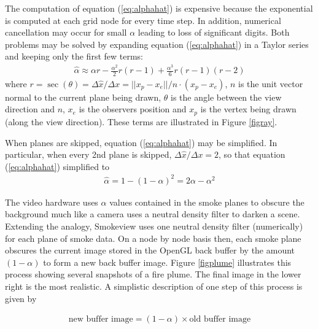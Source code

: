 \documentclass[11pt,twoside]{book}
\begin{document}
The computation of equation (\ref{eq:alphahat}) is expensive
because the exponential is computed at each grid node for every
time step.  In addition, numerical cancellation may occur for
small $\alpha$ leading to loss of significant digits. Both
problems may be solved by expanding equation (\ref{eq:alphahat})
in a Taylor series and keeping only the first few terms:
\begin{eqnarray*}
\hat{\alpha}\approx \alpha r -
\frac{\alpha^2}{2}r(r-1)+\frac{\alpha^3}{6}r(r-1)(r-2)
\end{eqnarray*}
where $r=\sec(\theta)=\Delta \hat{x}/\Delta
x=||x_p-x_e||/n\cdot(x_p-x_e)$, $n$ is the unit vector normal to
the current plane being drawn, $\theta$ is the angle between the
view direction and $n$, $x_e$ is the observers position and $x_p$
is the vertex being drawn (along the view direction).  These terms
are illustrated in Figure \ref{figray}.

When planes are skipped, equation (\ref{eq:alphahat}) may be simplified.  In particular,
when every 2nd plane is
skipped, $\Delta\hat{x}/\Delta x=2$, so that equation (\ref{eq:alphahat}) simplified to
\begin{eqnarray*}
\hat{\alpha}=1-(1-\alpha)^2=2\alpha-\alpha^2
\end{eqnarray*}

The video hardware uses $\alpha$ values contained in the smoke planes to obscure the background much like a camera uses a neutral density filter to darken a scene.  Extending the analogy, Smokeview uses one neutral density filter (numerically) for each plane of smoke data.  On a node by node basis then, each smoke plane obscures the current image stored in the OpenGL back buffer by the amount $(1-\alpha)$ to form a new back buffer image.  Figure \ref{figplume} illustrates this process showing several snapshots of a fire plume. The final image in the lower right is the most realistic.
A simplistic description of one step of this process is given by

\begin{eqnarray*}
\mbox{new buffer image} = (1-\alpha)\times \mbox{old buffer image}
\end{eqnarray*}
\end{document}
